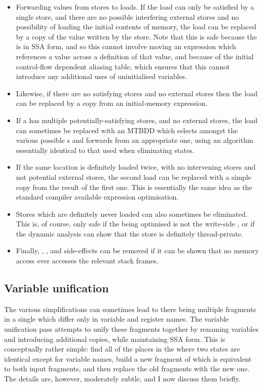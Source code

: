 \begin{itemize}
\item
  Forwarding values from stores to loads.  If the load can only be
  satisfied by a single store, and there are no possible interfering
  external stores and no possibility of loading the initial contents
  of memory, the load can be replaced by a copy of the value written
  by the store.  Note that this is safe because the {\StateMachine} is
  in SSA form, and so this cannot involve moving an expression which
  references a value across a definition of that value, and because of
  the initial control-flow dependent aliasing table, which ensures
  that this cannot introduce any additional uses of uninitialised
  variables.
\item
  Likewise, if there are no satisfying stores and no external stores
  then the load can be replaced by a copy from an initial-memory
  expression.
\item
  If a  has multiple potentially-satisfying stores, and no
  external stores, the load can sometimes be replaced with an MTBDD
  which selects amongst the various possible s and
  forwards from an appropriate one, using an algorithm essentially
  identical to that used when eliminating \state{$\Phi$} states.
\item
  If the same location is definitely loaded twice, with no intervening
  stores and not potential external stores, the second load can be
  replaced with a simple copy from the result of the first one.  This
  is essentially the same idea as the standard compiler available
  expression\needCite{} optimisation.
\item
  Stores which are definitely never loaded can also sometimes be
  eliminated.  This is, of course, only safe if the {\StateMachine}
  being optimised is not the write-side {\StateMachine}, or if the
  dynamic analysis can show that the store is definitely
  thread-private.
\item
  Finally, , , and
   side-effects can be removed if it can be shown
  that no memory access ever accesses the relevant stack frames.
\end{itemize}

\subsection{Variable unification}
\label{sect:unification}

The various {\StateMachine} simplifications can sometimes lead to
there being multiple fragments in a single \StateMachine which differ
only in variable and register names.  The variable unification pass
attempts to unify these fragments together by renaming variables and
introducing additional copies, while maintaining SSA form.  This is
conceptually rather simple: find all of the places in the
\StateMachine where two states are identical except for variable
names, build a new fragment of \StateMachine which is equivalent to
both input fragments, and then replace the old fragments with the new
one.  The details are, however, moderately subtle, and I now discuss
them briefly.


